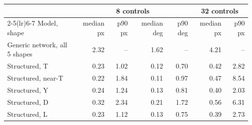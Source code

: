 
\begin{tabular}{lrrrrrr}
\toprule
& \multicolumn{4}{c}{8 controls} & \multicolumn{2}{c}{32 controls} \\
\cmidrule(lr){2-5}\cmidrule(lr){6-7}
Model, shape & median px & p90 px & median deg & p90 deg & median px & p90 px \\
\midrule
Generic network, all 5 shapes & 2.32 & -- & 1.62 & -- & 4.21 & -- \\
\midrule
Structured, T & 0.23 & 1.02 & 0.12 & 0.70 & 0.42 & 2.82 \\
Structured, near-T & 0.22 & 1.84 & 0.11 & 0.97 & 0.47 & 8.54 \\
Structured, Y & 0.24 & 1.24 & 0.13 & 0.81 & 0.40 & 2.03 \\
Structured, D & 0.32 & 2.34 & 0.21 & 1.72 & 0.56 & 6.31 \\
Structured, L & 0.23 & 1.12 & 0.13 & 0.75 & 0.39 & 2.73 \\
\bottomrule
\end{tabular}
